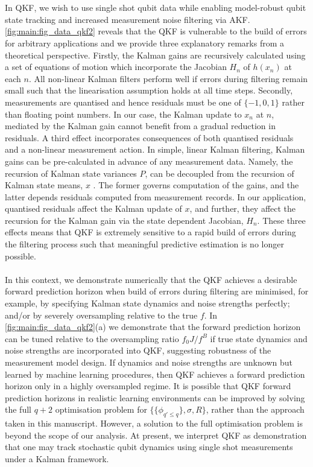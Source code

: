 \\
\\
In QKF, we wish to use single shot qubit data while enabling model-robust qubit state tracking and increased measurement noise filtering via AKF. \cref{fig:main:fig_data_qkf2} reveals that the QKF is vulnerable to the build of errors for arbitrary applications and we provide three explanatory remarks from a theoretical perspective. Firstly, the Kalman gains are recursively calculated using a set of  equations of motion which incorporate the Jacobian $H_n$ of $h(x_n)$ at each $n$. All non-linear Kalman filters perform well if errors during filtering remain small such that the linearisation assumption holds at all time steps. Secondly, measurements are quantised and hence residuals must be one of $\{-1, 0, 1 \}$ rather than floating point numbers.  In our case, the Kalman update to $x_n$ at $n$, mediated by the Kalman gain cannot benefit from a gradual reduction in residuals. A third effect incorporates consequences of both quantised residuals and a non-linear measurement action. In simple, linear Kalman filtering, Kalman gains can be pre-calculated in advance of any measurement data. Namely, the recursion of Kalman state variances $P$, can be decoupled from the recursion of Kalman state means, $x$ \cite{grewal2001theory}. The former governs computation of the gains, and the latter depends residuals computed from measurement records. In our application, quantised residuals affect the Kalman update of $x$, and further, they affect the recursion for the Kalman gain via the state dependent Jacobian, $H_n$. These three effects means that QKF is extremely sensitive to a rapid build of errors during the filtering process such that meaningful predictive estimation is no longer possible.
\\
\\
In this context, we demonstrate numerically that the QKF achieves a desirable forward prediction horizon when build of errors during filtering are minimised, for example, by specifying Kalman state dynamics and noise strengths perfectly; and/or by severely oversampling relative to the true $f$.   In \cref{fig:main:fig_data_qkf2}(a) we demonstrate that the forward prediction horizon can be tuned relative to the oversampling ratio $f_0J / f^B$ if true state dynamics and noise strengths are incorporated into QKF, suggesting robustness of the measurement model design.  If dynamics and noise strengths are unknown but learned by machine learning procedures, then QKF achieves a forward prediction horizon only in a highly oversampled regime. It is possible that QKF forward prediction horizons in realistic learning environments can be improved by solving the full $q+2$ optimisation problem for $\{\{ \phi_{q' \leq q}\}, \sigma, R\}$, rather than the approach taken in this manuscript. However, a solution to the full optimisation problem is beyond the scope of our analysis. At present, we interpret QKF as demonstration that one may track stochastic qubit dynamics using single shot measurements under a Kalman framework.

